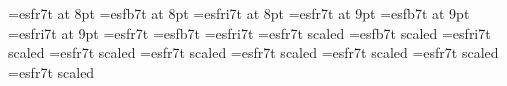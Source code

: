 %
\immediate{}
%
\font\eightrm=esfr7t at 8pt
\font\eightbf=esfb7t at 8pt
\font\eightit=esfri7t at 8pt
%
\font\ninerm=esfr7t at 9pt
\font\ninebf=esfb7t at 9pt
\font\nineit=esfri7t at 9pt
%
\font\tenrm=esfr7t
\font\tenbf=esfb7t
\font\tenit=esfri7t
%
\font\twelverm=esfr7t scaled 
\font\twelvebf=esfb7t scaled 
\font\twelveit=esfri7t scaled 
%
\font\bigfont=esfr7t scaled  %
\font\Bigfont=esfr7t scaled  %
\font\BIgfont=esfr7t scaled  %
\font\BIGfont=esfr7t scaled  %
%
\ifx\pmxversion\undefined\relax\else
  \font\Bigfont=esfr7t scaled  %
  \font\BIGfont=esfr7t scaled  %
\fi
%
\normtype
\endinput
